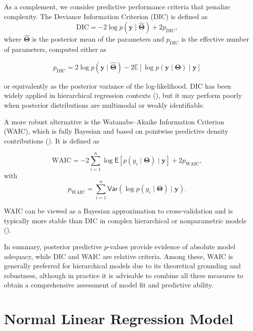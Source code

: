 \vspace{0.5cm}

As a complement, we consider predictive performance criteria that penalize complexity. The Deviance Information Criterion (DIC) is defined as
\begin{equation}
\label{DIC}
\text{DIC} = -2\log p(\bm{y}\mid \hat{\bm{\Theta}}) + 2p_{\text{DIC}},
\end{equation}
where $\hat{\bm{\Theta}}$ is the posterior mean of the parameters and $p_{\text{DIC}}$ is the effective number of parameters, computed either as

$$
p_{\text{DIC}} = 2\log p(\bm{y}\mid \hat{\bm{\Theta}}) - 2\mathbb{E}\left[\log p(\bm{y}\mid \bm{\Theta}) \mid \bm{y}\right]
$$

or equivalently as the posterior variance of the log-likelihood. DIC has been widely applied in hierarchical regression contexts (\cite{HOFF}), but it may perform poorly when posterior distributions are multimodal or weakly identifiable.

\vspace{0.5cm}

A more robust alternative is the Watanabe–Akaike Information Criterion (WAIC), which is fully Bayesian and based on pointwise predictive density contributions (\cite{watanabe}). It is defined as

\begin{equation}
\label{WAIC}
\text{WAIC} = -2\sum_{i=1}^n \log \mathsf{E}\left[p(y_i\mid \bm{\Theta}) \mid \bm{y}\right] + 2p_{\text{WAIC}},
\end{equation}
with
$$
p_{\text{WAIC}} = \sum_{i=1}^n \mathsf{Var}\left(\log p(y_i\mid \bm{\Theta}) \mid \mathbf{y}\right).
$$

WAIC can be viewed as a Bayesian approximation to cross-validation and is typically more stable than DIC in complex hierarchical or nonparametric models (\cite{SOSA}).

\vspace{0.5cm}

In summary, posterior predictive $p$-values provide evidence of absolute model adequacy, while DIC and WAIC are relative criteria. Among these, WAIC is generally preferred for hierarchical models due to its theoretical grounding and robustness, although in practice it is advisable to combine all three measures to obtain a comprehensive assessment of model fit and predictive ability.


\section{Normal Linear Regression Model}


